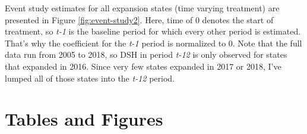 \documentclass[
  12pt,
]{article}
\begin{document}
Event study estimates for all expansion states (time varying treatment) are presented in Figure \ref{fig:event-study2}. Here, time of 0 denotes the start of treatment, so \emph{t-1} is the baseline period for which every other period is estimated. That's why the coefficient for the \emph{t-1} period is normalized to 0. Note that the full data run from 2005 to 2018, so DSH in period \emph{t-12} is only observed for states that expanded in 2016. Since very few states expanded in 2017 or 2018, I've lumped all of those states into the \emph{t-12} period.

\newpage
{}

\hypertarget{tables-and-figures}{%
\section{Tables and Figures}\label{tables-and-figures}}
\end{document}
